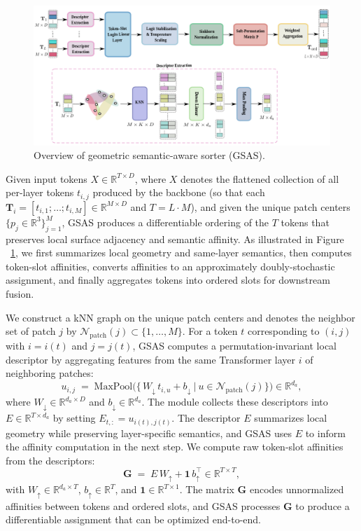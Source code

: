 \begin{figure}[h!]
  \centering 
    \includegraphics[width=0.98\linewidth]{figs/GSAS}
  \caption{Overview of geometric semantic-aware sorter (GSAS).}
  \label{fig:GSAS}
\end{figure}

Given input tokens \(X\in\mathbb{R}^{T\times D}\), where \(X\) denotes the flattened collection of all per-layer tokens \(t_{i,j}\) produced by the backbone (so that each \(\mathbf{T}_i=[t_{i,1};\dots;t_{i,M}]\in\mathbb{R}^{M\times D}\) and \(T=L\cdot M\)), and given the unique patch centers \(\{p_j\in\mathbb{R}^3\}_{j=1}^M\), GSAS produces a differentiable ordering of the \(T\) tokens that preserves local surface adjacency and semantic affinity. As illustrated in Figure ~\ref{fig:GSAS}, we first summarizes local geometry and same-layer semantics, then computes token-slot affinities, converts affinities to an approximately doubly-stochastic assignment, and finally aggregates tokens into ordered slots for downstream fusion.

We construct a kNN graph on the unique patch centers and denotes the neighbor set of patch \(j\) by \(\mathcal{N}_{\mathrm{patch}}(j)\subset\{1,\dots,M\}\). For a token \(t\) corresponding to \((i,j)\) with \(i=i(t)\) and \(j=j(t)\), GSAS computes a permutation-invariant local descriptor by aggregating features from the same Transformer layer \(i\) of neighboring patches:
\begin{equation}
u_{i,j} \;=\; \mathrm{MaxPool}\Big(\big\{\,W_{\downarrow}\,t_{i,u} + b_{\downarrow} \ \big|\ u\in\mathcal{N}_{\mathrm{patch}}(j)\big\}\Big)\in\mathbb{R}^{d_a},
\end{equation}
where \(W_{\downarrow}\in\mathbb{R}^{d_a\times D}\) and \(b_{\downarrow}\in\mathbb{R}^{d_a}\). The module collects these descriptors into \(E\in\mathbb{R}^{T\times d_a}\) by setting \(E_{t,:}=u_{i(t),j(t)}\). The descriptor \(E\) summarizes local geometry while preserving layer-specific semantics, and GSAS uses \(E\) to inform the affinity computation in the next step. We compute raw token-slot affinities from the descriptors:
\begin{equation}
\mathbf{G} \;=\; E\,W_{\uparrow} + \mathbf{1}\,b_{\uparrow}^\top \in\mathbb{R}^{T\times T},
\end{equation}
with \(W_{\uparrow}\in\mathbb{R}^{d_a\times T}\), \(b_{\uparrow}\in\mathbb{R}^T\), and \(\mathbf{1}\in\mathbb{R}^{T\times 1}\). The matrix \(\mathbf{G}\) encodes unnormalized affinities between tokens and ordered slots, and GSAS processes \(\mathbf{G}\) to produce a differentiable assignment that can be optimized end-to-end.

